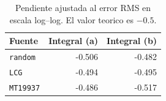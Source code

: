 \begin{table}[htbp]\centering
\caption{Pendiente ajustada al error RMS en escala log--log. El valor teorico es $-0.5$.}
\label{tab:pendientes}
\begin{tabular}{l|r|r}
\toprule
Fuente & Integral (a) & Integral (b) \\
\midrule
\texttt{random} & -0.506 & -0.482 \\
\texttt{LCG} & -0.494 & -0.495 \\
\texttt{MT19937} & -0.486 & -0.517 \\
\bottomrule
\end{tabular}
\end{table}
